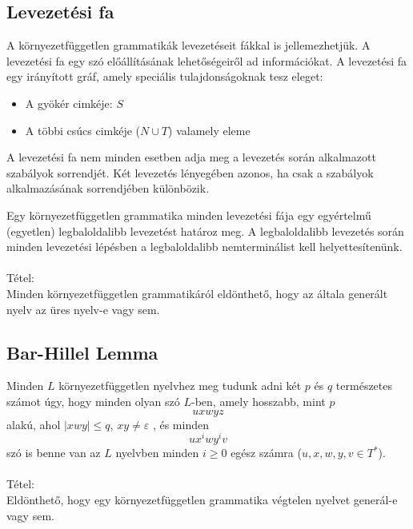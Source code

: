 \documentclass[margin=0px]{article}
\begin{document}
\subsection{Levezetési fa}
A környezetfüggetlen grammatikák levezetéseit fákkal is jellemezhetjük. A levezetési fa egy szó előállításának lehetőségeiről ad információkat. A levezetési fa egy irányított gráf, amely speciális tulajdonságoknak tesz eleget:
\begin{itemize}
    \item A gyökér cimkéje: $S$
    \item A többi csúcs cimkéje ($N\cup T$) valamely eleme
\end{itemize}
A levezetési fa nem minden esetben adja meg a levezetés során alkalmazott szabályok sorrendjét. Két levezetés lényegében azonos, ha csak a szabályok alkalmazásának sorrendjében különbözik.

Egy környezetfüggetlen grammatika minden levezetési fája egy egyértelmű (egyetlen) legbaloldalibb levezetést határoz meg. A legbaloldalibb levezetés során minden levezetési lépésben a legbaloldalibb nemterminálist kell helyettesítenünk.
\\\\
Tétel:\\
Minden környezetfüggetlen grammatikáról eldönthető, hogy az általa generált nyelv az üres nyelv-e vagy sem.
\subsection{Bar-Hillel Lemma}
Minden $L$ környezetfüggetlen nyelvhez meg tudunk adni két $p$ és $q$ természetes számot úgy, hogy minden olyan szó $L$-ben, amely hosszabb, mint $p$
\[uxwyz\]
alakú, ahol $|xwy| \leq q$, $xy \neq \varepsilon$ , és minden
\[ux^iwy^iv\]
szó is benne van az $L$ nyelvben minden $i \geq 0$ egész számra ($u,x,w,y,v \in T^*$).
\\\\
Tétel:\\
Eldönthető, hogy egy környezetfüggetlen grammatika végtelen nyelvet generál-e vagy sem.
\end{document}
